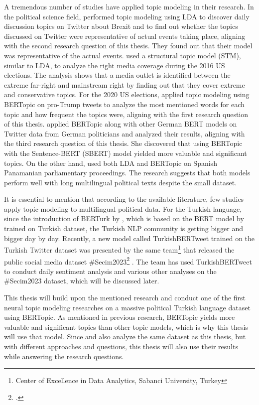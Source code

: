 A tremendous number of studies have applied topic modeling in their research. 
In the political science field, \textcite{ilyas_brexit_topic_modeling_2020} performed topic modeling 
using LDA to discover daily discussion topics on Twitter about Brexit and to find out whether 
the topics discussed on Twitter were representative of actual events taking place,
aligning with the second research question of this thesis.
They found out that their model was representative of the actual events.
\textcite{kaiser_right_media_USA_stm_topic_modeling_2020} used a structural topic model (STM), 
similar to LDA, to analyze the right media coverage during the 2016 US elections. 
The analysis shows that a media outlet is identified between the extreme far-right and 
mainstream right by finding out that they cover extreme and conservative topics.
For the 2020 US elections, \textcite{anwar_analyzing_twitter_BERT_QAnon_2021} applied 
topic modeling using BERTopic on pro-Trump tweets to analyze the most mentioned words for 
each topic and how frequent the topics were, aligning with the first research question of this thesis.
\textcite{bertopic_twitter_german_politics_2022} applied BERTopic along with other 
German BERT models on Twitter data from German politicians and analyzed their results,
aligning with the third research question of this thesis.
She discovered that using BERTopic with the Sentence-BERT (SBERT) model yielded more valuable and significant topics.
On the other hand, \textcite{contreras_panama_lda_bertopic_2022} used both LDA and BERTopic 
on Spanish Panamanian parliamentary proceedings. The research suggests that both 
models perform well with long multilingual political texts despite the small dataset. 

It is essential to mention that according to the available literature, few studies 
apply topic modeling to multilingual political data. For the Turkish language, 
since the introduction of BERTurk by \textcite{schweter_berturk_2020}, which is 
based on the BERT model by \textcite{devlin_bert_2019} trained on Turkish dataset,
the Turkish NLP community is getting bigger and bigger day by day. 
Recently, a new model called TurkishBERTweet trained on the Turkish Twitter dataset 
was presented by the same team\footnote{Center of Excellence in Data Analytics, Sabanci University, Turkey} 
that released the public social media dataset \#Secim2023\footcite{secim2023} \parencite{turkishbertweet_2023}. 
The team has used TurkishBERTweet to conduct daily sentiment analysis and 
various other analyses on the \#Secim2023 dataset, which will be discussed later.

This thesis will build upon the mentioned research and conduct one of the first 
neural topic modeling researches on a massive political Turkish language dataset using BERTopic. 
As mentioned in previous research, BERTopic yields more valuable and significant topics than 
other topic models, which is why this thesis will use that model.
Since \textcite{turkishbertweet_2023} and also \textcite{secim2023} analyze the same dataset 
as this thesis, but with different approaches and questions, this thesis will also use their 
results while answering the research questions.



